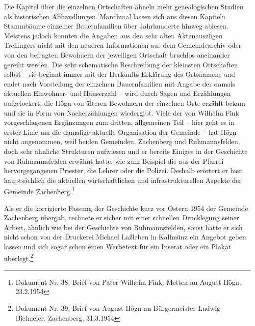 \documentclass[a4paper]{article}
\begin{document}
Die Kapitel über die einzelnen Ortschaften ähneln mehr genealogischen
Studien als historischen Abhandlungen. Manchmal lassen sich aus diesen
Kapiteln Stammbäume einzelner Bauernfamilien über Jahrhunderte hinweg
ablesen. Meistens jedoch konnten die Angaben aus den sehr alten
Aktenauszügen Trellingers nicht mit den neueren Informationen aus dem
Gemeindearchiv oder von den befragten Bewohnern der jeweiligen
Ortschaft bruchlos aneinander gereiht werden. Die sehr schematische
Beschreibung der kleinsten Ortschaften selbst – sie beginnt immer mit
der Herkunfts-Erklärung des Ortsnamens und endet nach Vorstellung der
einzelnen Bauernfamilien mit Angabe der damals aktuellen Einwohner- und
Häuserzahl – wird durch Sagen und Erzählungen aufgelockert, die Högn
von älteren Bewohnern der einzelnen Orte erzählt bekam und sie in Form
von Nacherzählungen wiedergibt. Viele der von Wilhelm Fink
vorgeschlagenen Ergänzungen zum dritten, allgemeinen Teil – hier geht
es in erster Linie um die damalige aktuelle Organisation der Gemeinde –
hat Högn nicht angenommen, weil beiden Gemeinden, Zachenberg und
Ruhmannsfelden, doch sehr ähnliche Strukturen aufwiesen und er bereits
Einiges in der Geschichte von Ruhmannsfelden erwähnt hatte, wie zum
Beispiel die aus der Pfarrei hervorgegangenen Priester, die Lehrer oder
die Polizei. Deshalb erörtert er hier hauptsächlich die aktuellen
wirtschaftlichen und infrastrukturellen Aspekte der Gemeinde
Zachenberg.\footnote{ Dokument Nr. 38, Brief von Pater Wilhelm Fink,
Metten an August Högn, 23.2.1954}

Als er die korrigierte Fassung der Geschichte kurz vor Ostern 1954 der
Gemeinde Zachenberg übergab, rechnete er sicher mit einer schnellen
Drucklegung seiner Arbeit, ähnlich wie bei der Geschichte von
Ruhmannsfelden, sonst hätte er sich nicht schon von der Druckerei
Michael Laßleben in Kallmünz ein Angebot geben lassen und sich sogar
schon einen Werbetext für ein Inserat oder ein Plakat
überlegt.\footnote{ Dokument Nr. 39, Brief von August Högn an
Bürgermeister Ludwig Bielmeier, Zachenberg, 31.3.1954} 
\end{document}
